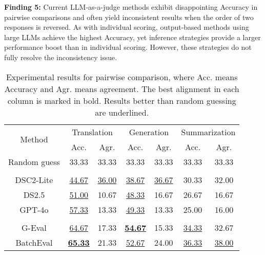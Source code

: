 \vspace*{6pt}
\begin{leftbar}
\textbf{Finding 5:} Current LLM-as-a-judge methods exhibit disappointing Accuracy in pairwise comparisons and often yield inconsistent results when the order of two responses is reversed. As with individual scoring, output-based methods using large LLMs achieve the highest Accuracy, yet inference strategies provide a larger performance boost than in individual scoring. However, these strategies do not fully resolve the inconsistency issue.
\end{leftbar}
\vspace*{6pt}

\begin{table}[]
    \centering
    \caption{Experimental results for pairwise comparison, where Acc. means Accuracy and Agr. means agreement. The best alignment in each column is marked in bold. Results better than random guessing are underlined.}
    \begin{tabular}{c|cc|cc|cc}
         \toprule 
         \multirow{2}{*}{Method} & \multicolumn{2}{c|}{Translation} & \multicolumn{2}{c|}{Generation} & \multicolumn{2}{c}{Summarization} \\

         & Acc. & Agr. & Acc. & Agr. & Acc. & Agr. \\ \midrule

         Random guess & 33.33 & 33.33 & 33.33 & 33.33 & 33.33 & 33.33 \\ \midrule

         \rowcolor{gray!40} \multicolumn{7}{c}{\textbf{Vanilla}} \\ \midrule
DSC2-Lite  & \underline{44.67} & \underline{36.00} & \underline{38.67} & \underline{36.67} & 30.33 & 32.00 \\
DS2.5     & \underline{51.00} & 10.67 & \underline{48.33} & 16.67 & 26.67 & 16.67 \\
GPT-4o      & \underline{57.33} & 13.33 & \underline{49.33} & 13.33 & 25.00 & 16.00 \\ \midrule

         \rowcolor{gray!40} \multicolumn{7}{c}{\textbf{Inference strategies}} \\ \midrule
G-Eval      & \underline{64.67} & 17.33 & \underline{\textbf{54.67}} & 15.33 & \underline{34.33} & 32.67 \\
BatchEval  & \underline{\textbf{65.33}} & 21.33 & \underline{52.67} & 24.00 & \underline{36.33} & \underline{38.00} \\ \midrule


\end{tabular}
\end{table}
